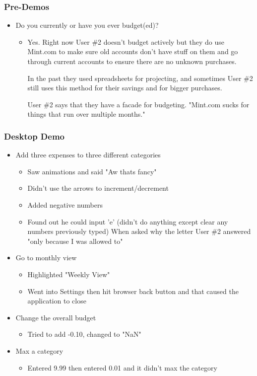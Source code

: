 \documentclass{chi2011}
\begin{document}
	\subsubsection{Pre-Demos}
	\begin{itemize}[noitemsep]
		\item Do you currently or have you ever budget(ed)?
		\begin{itemize}[noitemsep]
			\item 
				Yes. Right now User \#2 doesn't budget actively but they do use Mint.com to make sure old
				accounts don't have stuff on them and go through current accounts to ensure there are no
				unknown purchases. 
				
				In the past they used spreadsheets for projecting, and sometimes User \#2 still uses this
				method for their savings and for bigger purchases. 
				
				User \#2 says that they have a facade for budgeting. "Mint.com sucks for things that run over
				multiple months."
		\end{itemize}
	\end{itemize}
	
	\subsubsection{Desktop Demo}
	\begin{itemize}[noitemsep] 
		\item Add three expenses to three different categories
		\begin{itemize}[noitemsep]
			\item Saw animations and said "Aw thats fancy"
			\item Didn't use the arrows to increment/decrement
			\item Added negative numbers
			\item Found out he could input 'e' (didn't do anything except clear any numbers previously 
			typed) When asked why the letter User \#2 answered "only because I was allowed to"
		\end{itemize}
		\item Go to monthly view
		\begin{itemize}[noitemsep]
			\item Highlighted "Weekly View"
			\item Went into Settings then hit browser back button and that caused the application to close
		\end{itemize}
		\item Change the overall budget
		\begin{itemize}[noitemsep]
			\item Tried to add -0.10, changed to "NaN"
		\end{itemize}
		\item Max a category
		\begin{itemize}[noitemsep]
			\item Entered 9.99 then entered 0.01 and it didn't max the category
		\end{itemize}
	\end{itemize}
	
\end{document}
